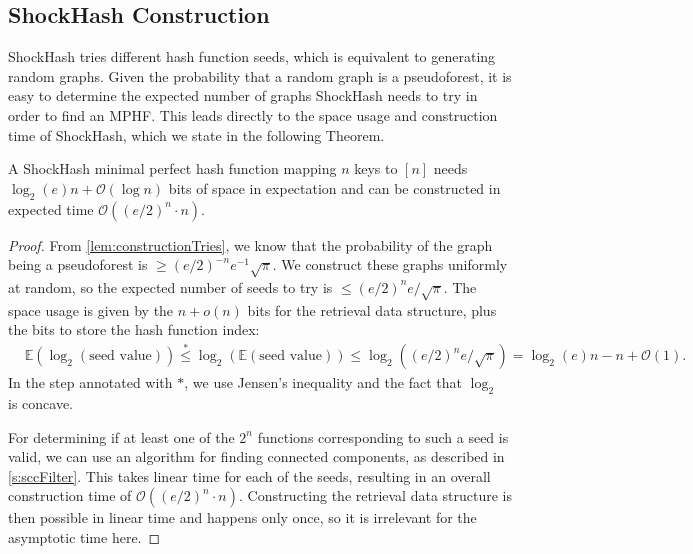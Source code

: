 \documentclass[a4paper,USenglish,cleveref]{lipics-v2021}
\newcommand{\Oh}{\mathcal{O}}
\begin{document}
\subsection{ShockHash Construction}\label{ss:analysisShockHash}
ShockHash tries different hash function seeds, which is equivalent to generating random graphs.
Given the probability that a random graph is a pseudoforest, it is easy to determine the expected number of graphs ShockHash needs to try in order to find an MPHF.
This leads directly to the space usage and construction time of ShockHash, which we state in the following Theorem.

\begin{theorem}
  \label{thm:shockHashConstruction}
  A ShockHash minimal perfect hash function mapping $n$ keys to $[n]$ needs $\log_2(e)n + \Oh(\log n)$ bits of space in expectation and can be constructed in expected time $\Oh((e/2)^n \cdot n)$.
\end{theorem}
\begin{proof}
  From \cref{lem:constructionTries}, we know that the probability of the graph being a pseudoforest is $\geq (e/2)^{-n} e^{-1}\sqrt{\pi}$.
  We construct these graphs uniformly at random, so the expected number of seeds to try is $\leq (e/2)^{n} e / \sqrt{\pi}$.
  The space usage is given by the $n + o(n)$ bits for the retrieval data structure, plus the bits to store the hash function index:
  \begin{align*}
    &\mathds{E}(\log_2(\textrm{seed value}))
    \overset{*}{\leq} \log_2(\mathds{E}(\textrm{seed value}))
    \leq \log_2\left((e/2)^{n} e / \sqrt{\pi}\right)
    = \log_2(e)n - n + \Oh(1).
  \end{align*}
  In the step annotated with $*$, we use Jensen's inequality \cite{jensen1906fonctions} and the fact that $\log_2$ is concave.

  For determining if at least one of the $2^n$ functions corresponding to such a seed is valid, we can use an algorithm for finding connected components, as described in \cref{s:sccFilter}.
  This takes linear time for each of the seeds, resulting in an overall construction time of $\Oh((e/2)^n \cdot n)$.
  Constructing the retrieval data structure is then possible in linear time \cite{dillinger2022burr} and happens only once, so it is irrelevant for the asymptotic time here.
  \hfill
\end{proof}
\end{document}
